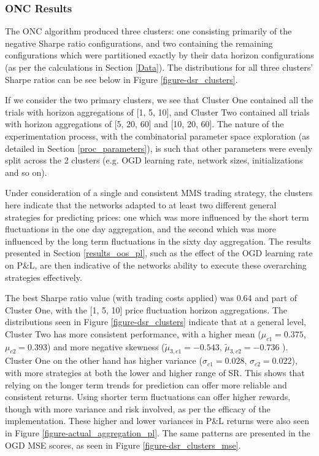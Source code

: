 \documentclass[a4paper,11pt,oneside]{article}
\theoremstyle{plain}
\theoremstyle{definition}
\begin{document}
	\subsubsection{ONC Results}\label{results_onc}
	
	The ONC algorithm produced three clusters: one consisting primarily of the negative Sharpe ratio configurations, and two containing the remaining configurations which were partitioned exactly by their data horizon configurations (as per the calculations in Section \ref{Data}). The distributions for all three clusters' Sharpe ratios can be see below in Figure \ref{figure-dsr_clusters}.\newline
		
	If we consider the two primary clusters, we see that Cluster One contained all the trials with horizon aggregations of [1, 5, 10], and Cluster Two contained all trials with horizon aggregations of [5, 20, 60] and [10, 20, 60]. The nature of the experimentation process, with the combinatorial parameter space exploration (as detailed in Section \ref{proc_parameters}), is such that other parameters were evenly split across the 2 clusters (e.g. OGD learning rate, network sizes, initializations and so on).\newline
	
	Under consideration of a single and consistent MMS trading strategy, the clusters here indicate that the networks adapted to at least two different general strategies for predicting prices: one which was more influenced by the short term fluctuations in the one day aggregation, and the second which was more influenced by the long term fluctuations in the sixty day aggregation. The results presented in Section \ref{results_oos_pl}, such as the effect of the OGD learning rate on P\&L, are then indicative of the networks ability to execute these overarching strategies effectively. \newline
	
	The best Sharpe ratio value (with trading costs applied) was 0.64 and part of Cluster One, with the [1, 5, 10] price fluctuation horizon aggregations. The distributions seen in Figure \ref{figure-dsr_clusters} indicate that at a general level, Cluster Two has more consistent performance, with a higher mean ($\mu_{c1} = 0.375$, $\mu_{c2} = 0.393$) and more negative skewness ($\tilde{\mu}_{3,c1} = -0.543$, $\tilde{\mu}_{3,c2} = -0.736$ ). Cluster One on the other hand has higher variance ($\sigma_{c1} = 0.028$, $\sigma_{c2} = 0.022$), with more strategies at both the lower and higher range of SR. This shows that relying on the longer term trends for prediction can offer more reliable and consistent returns. Using shorter term fluctuations can offer higher rewards, though with more variance and risk involved, as per the efficacy of the implementation. These higher and lower variances in P\&L returns were also seen in Figure \ref{figure-actual_aggregation_pl}. The same patterns are presented in the OGD MSE scores, as seen in Figure \ref{figure-dsr_clusters_mse}.\newline
\end{document}
